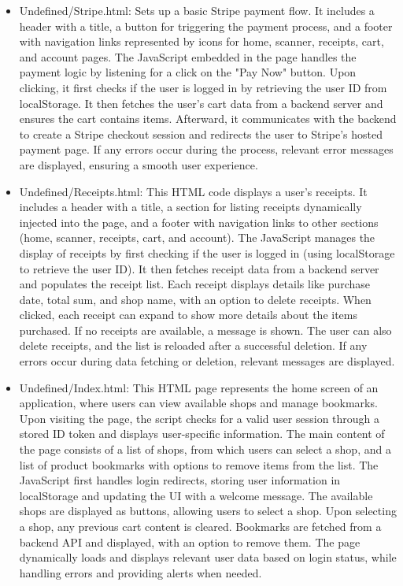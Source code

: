 \documentclass[conference]{IEEEtran}
\begin{document}
\begin{itemize}
  \item Undefined/Stripe.html: Sets up a basic Stripe payment flow. It includes a header with a title, a button for triggering the payment process, and a footer with navigation links represented by icons for home, scanner, receipts, cart, and account pages. The JavaScript embedded in the page handles the payment logic by listening for a click on the "Pay Now" button. Upon clicking, it first checks if the user is logged in by retrieving the user ID from localStorage. It then fetches the user's cart data from a backend server and ensures the cart contains items. Afterward, it communicates with the backend to create a Stripe checkout session and redirects the user to Stripe's hosted payment page. If any errors occur during the process, relevant error messages are displayed, ensuring a smooth user experience.
  \item Undefined/Receipts.html: This HTML code displays a user's receipts. It includes a header with a title, a section for listing receipts dynamically injected into the page, and a footer with navigation links to other sections (home, scanner, receipts, cart, and account). The JavaScript manages the display of receipts by first checking if the user is logged in (using localStorage to retrieve the user ID). It then fetches receipt data from a backend server and populates the receipt list. Each receipt displays details like purchase date, total sum, and shop name, with an option to delete receipts. When clicked, each receipt can expand to show more details about the items purchased. If no receipts are available, a message is shown. The user can also delete receipts, and the list is reloaded after a successful deletion. If any errors occur during data fetching or deletion, relevant messages are displayed.
  \item Undefined/Index.html: This HTML page represents the home screen of an application, where users can view available shops and manage bookmarks. Upon visiting the page, the script checks for a valid user session through a stored ID token and displays user-specific information. The main content of the page consists of a list of shops, from which users can select a shop, and a list of product bookmarks with options to remove items from the list. The JavaScript first handles login redirects, storing user information in localStorage and updating the UI with a welcome message. The available shops are displayed as buttons, allowing users to select a shop. Upon selecting a shop, any previous cart content is cleared. Bookmarks are fetched from a backend API and displayed, with an option to remove them. The page dynamically loads and displays relevant user data based on login status, while handling errors and providing alerts when needed.

\end{itemize}
\end{document}
